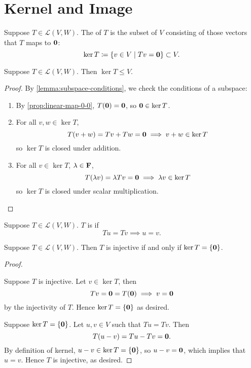 \section{Kernel and Image}
\begin{definition}[Kernel]
Suppose $T\in\mathcal{L}(V,W)$. The  of $T$ is the subset of $V$ consisting of those vectors that $T$ maps to $\vb{0}$:
\[\ker T\coloneqq\{v\in V\mid Tv=\vb{0}\}\subset V.\]
\end{definition}

\begin{proposition}
Suppose $T\in\mathcal{L}(V,W)$. Then $\ker T\le V$.
\end{proposition}

\begin{proof}
By \cref{lemma:subspace-conditions}, we check the conditions of a subspace:
\begin{enumerate}[label=(\roman*)]
\item By \cref{prop:linear-map-0-0}, $T(\vb{0})=\vb{0}$, so $\vb{0}\in\ker T$.
\item For all $v,w\in\ker T$, 
\[T(v+w)=Tv+Tw=\vb{0}\implies v+w\in\ker T\]
so $\ker T$ is closed under addition.
\item For all $v\in\ker T$, $\lambda\in\mathbf F$,
\[T(\lambda v)=\lambda Tv=\vb{0}\implies\lambda v\in\ker T\]
so $\ker T$ is closed under scalar multiplication.
\end{enumerate}
\end{proof}

\begin{definition}[Injectivity]
Suppose $T\in\mathcal{L}(V,W)$. $T$ is  if
\[Tu=Tv\implies u=v.\]
\end{definition}

\begin{proposition}
Suppose $T\in\mathcal{L}(V,W)$. Then $T$ is injective if and only if $\ker T=\{\vb{0}\}$.
\end{proposition}

\begin{proof} \

\fbox{$\implies$} Suppose $T$ is injective. Let $v\in\ker T$, then
\[Tv=\vb{0}=T(\vb{0})\implies v=\vb{0}\]
by the injectivity of $T$. Hence $\ker T=\{\vb{0}\}$ as desired.

\fbox{$\impliedby$} Suppose $\ker T=\{\vb{0}\}$. Let $u,v\in V$ such that $Tu=Tv$. Then
\[T(u-v)=Tu-Tv=\vb{0}.\]
By definition of kernel, $u-v\in\ker T=\{\vb{0}\}$, so $u-v=\vb{0}$, which implies that $u=v$. Hence $T$ is injective, as desired.
\end{proof}

